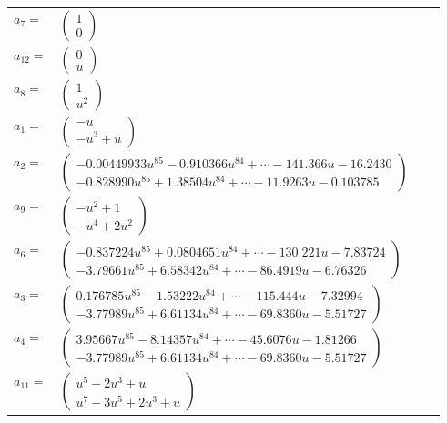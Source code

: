 \documentclass[1p]{elsarticle_modified}
\theoremstyle{definition}
\begin{document}
\begin{tabular}{m{7pt} m{180pt} m{7pt} m{180pt} }
\flushright $a_{7}=$&$\begin{pmatrix}1\\0\end{pmatrix}$ \\
\flushright $a_{12}=$&$\begin{pmatrix}0\\u\end{pmatrix}$ \\
\flushright $a_{8}=$&$\begin{pmatrix}1\\u^2\end{pmatrix}$ \\
\flushright $a_{1}=$&$\begin{pmatrix}- u\\- u^3+u\end{pmatrix}$ \\
\flushright $a_{2}=$&$\begin{pmatrix}-0.00449933 u^{85}-0.910366 u^{84}+\cdots-141.366 u-16.2430\\-0.828990 u^{85}+1.38504 u^{84}+\cdots-11.9263 u-0.103785\end{pmatrix}$ \\
\flushright $a_{9}=$&$\begin{pmatrix}- u^2+1\\- u^4+2 u^2\end{pmatrix}$ \\
\flushright $a_{6}=$&$\begin{pmatrix}-0.837224 u^{85}+0.0804651 u^{84}+\cdots-130.221 u-7.83724\\-3.79661 u^{85}+6.58342 u^{84}+\cdots-86.4919 u-6.76326\end{pmatrix}$ \\
\flushright $a_{3}=$&$\begin{pmatrix}0.176785 u^{85}-1.53222 u^{84}+\cdots-115.444 u-7.32994\\-3.77989 u^{85}+6.61134 u^{84}+\cdots-69.8360 u-5.51727\end{pmatrix}$ \\
\flushright $a_{4}=$&$\begin{pmatrix}3.95667 u^{85}-8.14357 u^{84}+\cdots-45.6076 u-1.81266\\-3.77989 u^{85}+6.61134 u^{84}+\cdots-69.8360 u-5.51727\end{pmatrix}$ \\
\flushright $a_{11}=$&$\begin{pmatrix}u^5-2 u^3+u\\u^7-3 u^5+2 u^3+u\end{pmatrix}$ \\

\end{tabular}
\end{document}
